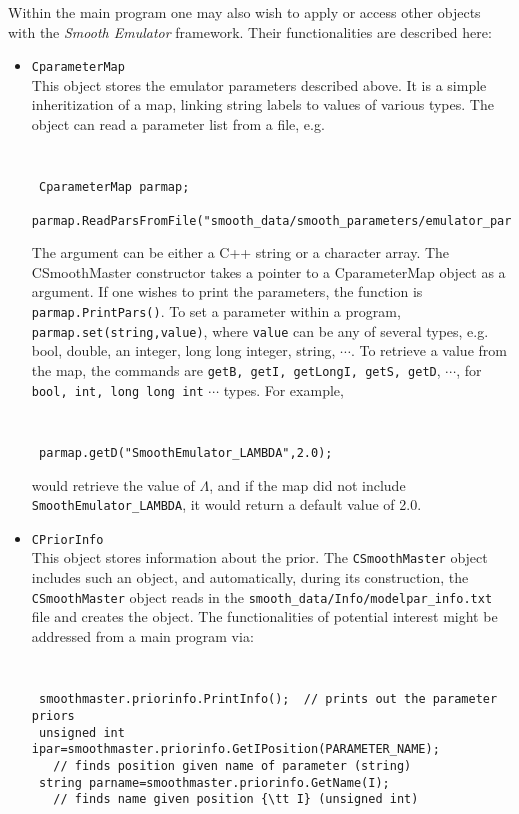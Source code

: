 \documentclass[UserManual.tex]{subfiles}
\begin{document}
Within the main program one may also wish to apply or access other objects with the {\it Smooth Emulator} framework. Their functionalities are described here:
\begin{itemize}\itemsep=0pt
\item {\tt CparameterMap}\\
This object stores the emulator parameters described above. It is a simple inheritization of a map, linking string labels to values of various types. The object can read a parameter list from a file, e.g.\\
{\tt
\begin{verbatim}
 CparameterMap parmap;
 parmap.ReadParsFromFile("smooth_data/smooth_parameters/emulator_parameters.txt")
\end{verbatim}}
The argument can be either a C++ string or a character array. The CSmoothMaster constructor takes a pointer to a CparameterMap object as a argument. If one wishes to print the parameters, the function is {\tt parmap.PrintPars()}. To set a parameter within a program, {\tt parmap.set(string,value)}, where {\tt value} can be any of several types, e.g. bool, double, an integer, long long integer, string, $\cdots$. To retrieve a value from the map, the commands are {\tt getB, getI, getLongI, getS, getD}, $\cdots$, for {\tt bool, int, long long int} $\cdots$ types. For example, 
{\tt
\begin{verbatim}
 parmap.getD("SmoothEmulator_LAMBDA",2.0);
\end{verbatim}}
would retrieve the value of $\Lambda$, and if the map did not include {\tt SmoothEmulator\_LAMBDA}, it would return a default value of 2.0.

\item {\tt CPriorInfo}\\
This object stores information about the prior. The {\tt CSmoothMaster} object includes such an object, and automatically, during its construction, the {\tt CSmoothMaster} object reads in the {\tt smooth\_data/Info/modelpar\_info.txt} file and creates the object. The functionalities of potential interest might be addressed from a main program via:\\
{\tt
\begin{verbatim}
 smoothmaster.priorinfo.PrintInfo();  // prints out the parameter priors
 unsigned int ipar=smoothmaster.priorinfo.GetIPosition(PARAMETER_NAME);
   // finds position given name of parameter (string)
 string parname=smoothmaster.priorinfo.GetName(I);
   // finds name given position {\tt I} (unsigned int)
\end{verbatim}}


\end{itemize}
\end{document}
